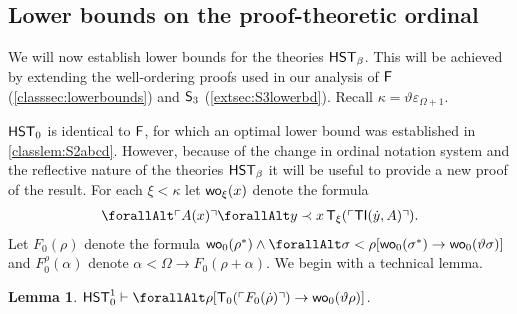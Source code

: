 \documentclass[UKenglish,cleveref,DIV=12]{scrartcl}
\let\forall\forallAlt
\newtheorem{lemma}{Lemma}
\theoremstyle{definition}
\theoremstyle{definition}
\begin{document}
\subsection{Lower bounds on the proof-theoretic ordinal}\label{extsec:Fblower}
We will now establish lower bounds for the theories $\mathsf{HST}_\beta$. This will be achieved by extending the well-ordering proofs used in our analysis of $\mathsf{F}$ (\cref{classsec:lowerbounds}) and $\mathsf{S}_3$ (\cref{extsec:S3lowerbd}). Recall $\kappa=\vartheta\varepsilon_{\Omega+1}$.

%
$\mathsf{HST}_0$ is identical to $\mathsf{F}$, for which an optimal lower bound was established
in \cref{classlem:S2abcd}. However, because of the change in ordinal notation
system and the reflective nature of the theories $\mathsf{HST}_\beta$ it will be useful
to provide a new proof of the result.
For each $\xi<\kappa$ let $\mathsf{wo}_\xi(x)$ denote the formula
\begin{align*}
  \forall\gn {A(x)}\forall y\prec x\,\T_\xi(\gn{\TI(\dot y,A)}).
\end{align*}
Let $F_0(\rho)$ denote the formula $\wo_0(\rho^*)\land \forall\sigma<\rho[
\wo_0(\sigma^*)\rightarrow \wo_0(\vartheta\sigma)]$ and $F_0^\rho(\alpha)$ denote
$\alpha<\Omega\rightarrow F_0(\rho+\alpha)$. We begin with a technical lemma.
\begin{lemma}\label{extlem:F0tech}
 $\HST_0^1\proves \forall\rho[\T_0(\gn{F_0(\dot\rho)})\rightarrow \wo_0(\vartheta\rho)]$.
\end{lemma}
\end{document}
